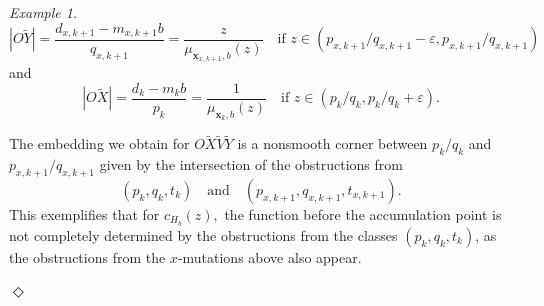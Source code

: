 \documentclass[11pt, reqno]{amsart}
\theoremstyle{remark}
\numberwithin{equation}{subsection}
\numberwithin{figure}{section}
\theoremstyle{customremark}
\newtheorem{example_no_diamond}[thm]{Example}
\newenvironment{example}{\begin{example_no_diamond} } {\hfill$\er$ \end{example_no_diamond}}
\newcommand{\er}{{\Diamond}}
\newcommand{\eps}{\varepsilon}
\begin{document}
\begin{example}
\[|O\tilde{Y}|=\frac{d_{x,k+1}-m_{x,k+1}b}{q_{x,k+1}}=\frac{z}{\mu_{\bm{x}_{x,k+1},b}(z)} \quad \text{if $z \in (p_{x,k+1}/q_{x,k+1}-\eps,p_{x,k+1}/q_{x,k+1})$}\] 
and 
\[ |O\tilde{X}|=\frac{d_k-m_kb}{p_k}=\frac{1}{\mu_{\bm{x}_k,b}(z)} \quad \text{if $z \in (p_k/q_k,p_k/q_k+\eps)$} .\]

The embedding we obtain for $O\tilde{X}\tilde{V}\tilde{Y}$ is a nonsmooth corner between $p_k/q_k$ and $p_{x,k+1}/q_{x,k+1}$ given by the intersection of the obstructions from \[(p_k,q_k,t_k) \quad \text{and} \quad (p_{x,k+1},q_{x,k+1},t_{x,k+1}).\] This exemplifies that for $c_{H_b}(z),$ the function before the accumulation point is not completely determined by the obstructions from the classes $(p_k,q_k,t_k)$, as the obstructions from the $x$-mutations above also appear. 


\end{example}
 
\end{document}
